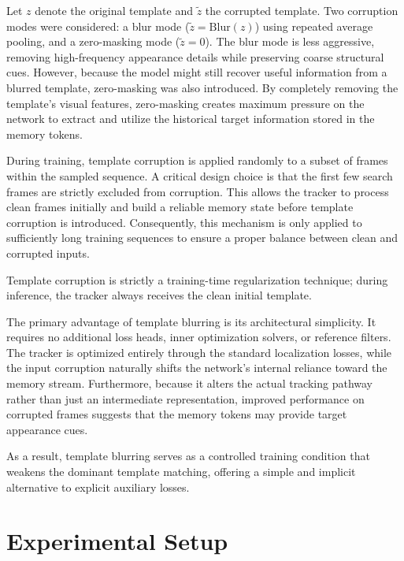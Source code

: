 \documentclass[bachelorthesis]{fer}
\numberwithin{equation}{chapter}
\begin{document}
    Let \(z\) denote the original template and \(\tilde{z}\) the corrupted template. Two corruption modes were considered: a
    blur
    mode (\(\tilde{z} = \text{Blur}(z)\)) using repeated average pooling, and a zero-masking mode (\(\tilde{z} = 0\)). The blur
    mode is less aggressive, removing high-frequency appearance details while preserving coarse structural cues. However,
    because the model might still recover useful information from a blurred template, zero-masking was also introduced. By
    completely removing the template's visual features, zero-masking creates maximum pressure on the network to extract and
    utilize the historical target information stored in the memory tokens.

    During training, template corruption is applied randomly to a subset of frames within the sampled sequence. A
    critical design choice is that the first few search frames are strictly excluded from corruption. This allows
    the tracker to process clean frames initially and build a reliable memory state before template corruption is
    introduced.
    Consequently, this mechanism is only applied to sufficiently long training sequences to ensure a proper balance between
    clean and corrupted inputs.

    Template corruption is strictly a training-time regularization technique; during inference, the tracker always receives
    the clean initial template.

    The primary advantage of template blurring is its architectural simplicity. It requires no additional loss heads, inner
    optimization solvers, or reference filters. The tracker is optimized entirely through the standard localization losses,
    while the input corruption naturally shifts the network's internal reliance toward the memory stream. Furthermore,
    because it alters the actual tracking pathway rather than just an intermediate representation, improved performance on
    corrupted frames suggests that the memory tokens may provide target appearance cues.

    As a result, template blurring serves as a controlled training condition that weakens the dominant template
    matching, offering a simple and implicit alternative to explicit auxiliary losses.


    \chapter{Experimental Setup}\label{experimental-setup}
\end{document}
